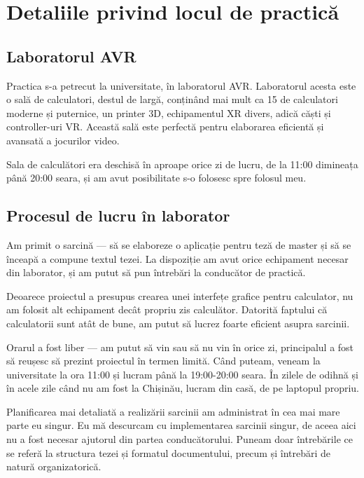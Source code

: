 \documentclass[a4paper,12pt]{report}
\begin{document}
\chapter{Detaliile privind locul de practică}

\section{Laboratorul AVR}

Practica s-a petrecut la universitate, în laboratorul AVR.
Laboratorul acesta este o sală de calculatori, destul de largă,
conținând mai mult ca 15 de calculatori moderne și puternice,
un printer \ac{3D}, echipamentul \ac{XR} divers,
adică căști și controller-uri \ac{VR}.
Această sală este perfectă pentru elaborarea eficientă și avansată a jocurilor video.

Sala de calculători era deschisă în aproape orice zi de lucru,
de la 11:00 dimineața până 20:00 seara, și am avut posibilitate s-o folosesc spre folosul meu.


\section{Procesul de lucru în laborator}

Am primit o sarcină --- să se elaboreze o aplicație pentru teză de master 
și să se înceapă a compune textul tezei.
La dispoziție am avut orice echipament necesar din laborator,
și am putut să pun întrebări la conducător de practică.

Deoarece proiectul a presupus crearea unei interfețe grafice pentru calculator,
nu am folosit alt echipament decât propriu zis calculător.
Datorită faptului că calculatorii sunt atât de bune, am putut să lucrez foarte eficient asupra sarcinii.

Orarul a fost liber --- am putut să vin sau să nu vin în orice zi, principalul a fost să reușesc să prezint proiectul în termen limită.
Când puteam, veneam la universitate la ora 11:00 și lucram până la 19:00-20:00 seara.
În zilele de odihnă și în acele zile când nu am fost la Chișinău, lucram din casă, de pe laptopul propriu.

Planificarea mai detaliată a realizării sarcinii am administrat în cea mai mare parte eu singur.
Eu mă descurcam cu implementarea sarcinii singur,
de aceea aici nu a fost necesar ajutorul din partea conducătorului.
Puneam doar întrebările ce se referă la structura tezei și formatul documentului,
precum și întrebări de natură organizatorică.
\end{document}

